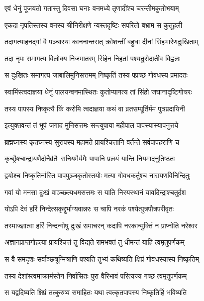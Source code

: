 \twolineshloka
{एवं धेनुं पूजयतो गतास्तु दिवसा घनाः}
{वनमध्ये तृणादींश्च चरन्तीमकुतोभयाम्}%

\twolineshloka
{एकदा नृपतिस्तस्य वनस्य श्रीनिरीक्षणे}
{न्यस्तदृष्टिः सपरितो बभ्राम स कुतूहली}%

\twolineshloka
{तदागत्याहनद्गां वै पञ्चास्यः काननान्तरात्}
{क्रोशन्तीं बहुधा दीनां सिंहभारेणदुःखिताम्}%

\twolineshloka
{तदा नृपः समागत्य विलोक्य निजमातरम्}
{सिंहेन निहतां पश्यन्रुरोदातीव विह्वलः}%

\twolineshloka
{स दुःखितः समागत्य जाबालिमुनिसत्तमम्}
{निष्कृतिं तस्य पप्रच्छ गोवधस्य प्रमादतः}%


\twolineshloka
{स्वामिंस्त्वदाज्ञया धेनुं पालयन्वनमास्थितः}
{कुतोप्यागत्य तां सिंहो जघानादृष्टिगोचरः}%

\twolineshloka
{तस्य पापस्य निष्कृत्यै किं करोमि त्वदाज्ञया}
{कथं वा व्रतसम्पूर्तिर्मम पुत्रप्रदायिनी}%

\twolineshloka
{इत्युक्तवन्तं तं भूपं जगाद मुनिसत्तमः}
{सन्त्युपाया महीपाल पापस्यास्यापनुत्तये}%

\twolineshloka
{ब्रह्मघ्नस्य कृतघ्नस्य सुरापस्य महामते}
{प्रायश्चित्तानि वर्तन्ते सर्वपापहराणि च}%

\twolineshloka
{कृच्छ्रैश्चान्द्रायणैर्दानैर्व्रतैः सनियमैर्यमैः}
{पापानि प्रलयं यान्ति नियमादनुतिष्ठतः}%

\twolineshloka
{द्वयोश्च निष्कृतिर्नास्ति पापपुञ्जकृतोस्तयोः}
{मत्या गोवधकर्तुश्च नारायणविनिन्दितुः}%

\twolineshloka
{गवां यो मनसा दुःखं वाञ्च्छत्यधमसत्तमः}
{स याति निरयस्थानं यावदिन्द्राश्चतुर्दश}%

\twolineshloka
{योऽपि देवं हरिं निन्देत्सकृद्दुर्भाग्यवान्नरः}
{स चापि नरकं पश्येत्पुत्रपौत्रपरीवृतः}%

\twolineshloka
{तस्माज्ज्ञात्वा हरिं निन्दन्गोषु दुःखं समाचरन्}
{कदापि नरकान्मुक्तिं न प्राप्नोति नरेश्वर}%

\twolineshloka
{अज्ञानप्राप्तगोहत्या प्रायश्चित्तं तु विद्यते}
{रामभक्तं तु धीमन्तं याहि त्वमृतुपर्णकम्}%

\twolineshloka
{स वै समदृशः सर्वाञ्छत्रून्मित्राणि पश्यति}
{तुभ्यं कथिष्यति क्षिप्रं गोवधस्यास्य निष्कृतिम्}%

\twolineshloka
{तस्य देशांस्त्वमाक्रामंस्तेन निर्वासितः पुरा}
{वैरिभावं परित्यज्य गच्छ त्वमृतुपर्णकम्}%

\twolineshloka
{स यद्वदिष्यति क्षिप्रं तत्कुरुष्व समाहितः}
{यथा त्वत्कृतपापस्य निष्कृतिर्हि भविष्यति}%


